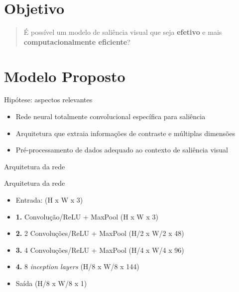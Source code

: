 \documentclass[10pt]{beamer}
\newcommand{\tit}[1]{\textit{#1}}
\newcommand{\tbf}[1]{\textbf{#1}}
\begin{document}
\section{Objetivo}

\begin{frame}{}
    \begin{quote}
        É possível um modelo de saliência visual que seja \tbf{efetivo} e
        mais \tbf{computacionalmente eficiente}?
    \end{quote}
\end{frame}

\section{Modelo Proposto}

\begin{frame}{Hipótese: aspectos relevantes}
    \begin{itemize}[<+->]
        \item Rede neural totalmente convolucional específica para saliência
        \item Arquitetura que extraia informações de contraste e
            múltiplas dimensões
        \item Pré-processamento de dados adequado ao contexto de saliência
            visual
    \end{itemize}
\end{frame}

\begin{frame}{Arquitetura da rede}
    \begin{figure}[hbt]
        \centering
        \def\svgwidth{1.0\columnwidth}
        
        \label{fig:model}
    \end{figure}
\end{frame}

\begin{frame}{Arquitetura da rede}
    \begin{figure}[hbt]
        \centering
        \def\svgwidth{1.0\columnwidth}
        
        \label{fig:model}
    \end{figure}
    \begin{itemize}[<+->]
        \item Entrada: (H x W x 3)
        \item \tbf{1.} Convolução/ReLU + MaxPool (H x W x 3)
        \item \tbf{2.} 2 Convoluções/ReLU + MaxPool (H/2 x W/2 x 48)
        \item \tbf{3.} 4 Convoluções/ReLU + MaxPool (H/4 x W/4 x 96)
        \item \tbf{4.} 8 \tit{inception layers} (H/8 x W/8 x 144)
        \item Saída (H/8 x W/8 x 1)
    \end{itemize}
\end{frame}
\end{document}
